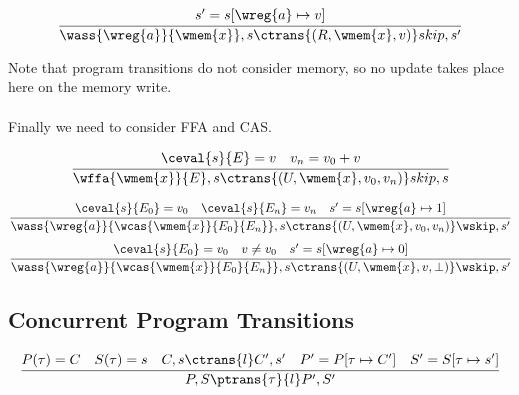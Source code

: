 \begin{minipage}{.5\textwidth}
	\[\cfrac{
			s' = s[\wreg{a} \mapsto v]
		}{
			\wass{\wreg{a}}{\wmem{x}}, s \ctrans{(R, \wmem{x}, v)} skip, s'
		}\]
\end{minipage}
Note that program transitions do not consider memory, so no update takes place here on the memory write.
\\
\\ Finally we need to consider FFA and CAS.
\\ \begin{minipage}{.5\textwidth}
	\[\cfrac{
			\ceval{s}{E} = v \quad v_n = v_0 + v
		}{
			\wffa{\wmem{x}}{E},s \ctrans{(U, \wmem{x}, v_0, v_n)} skip, s
		}\]
\end{minipage}
\begin{minipage}{.5\textwidth}
	\[
		\cfrac{
			\ceval{s}{E_0} = v_0 \quad \ceval{s}{E_n} = v_n \quad s' = s[\wreg{a} \mapsto 1]
		}{
			\wass{\wreg{a}}{\wcas{\wmem{x}}{E_0}{E_n}}, s \ctrans{(U, \wmem{x}, v_0, v_n)} \wskip, s'
		}
	\]
	\[
		\cfrac{
			\ceval{s}{E_0} = v_0 \quad v \neq v_0 \quad s' = s[\wreg{a} \mapsto 0]
		}{
			\wass{\wreg{a}}{\wcas{\wmem{x}}{E_0}{E_n}}, s \ctrans{(U, \wmem{x}, v, \bot)} \wskip, s'
		}
	\]
\end{minipage}



\subsection{Concurrent Program Transitions}
\[\cfrac{
	P(\tau) = C \quad S(\tau) = s \quad C,s \ctrans{l} C', s' \quad P' = P[\tau \mapsto C'] \quad S'=S[\tau \mapsto s']
	}{
	P, S \ptrans{\tau}{l} P', S'
	}\]

